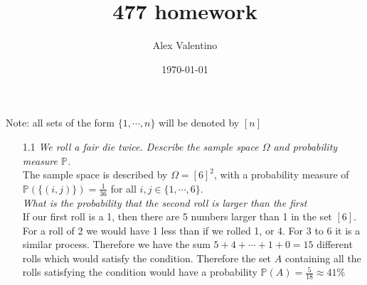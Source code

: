 \documentclass[12pt, letterpaper]{article}
\date{\today}
\author{Alex Valentino}
\title{477 homework}
\begin{document}
Note: all sets of the form $\{1,\cdots, n\}$ will be denoted by $[n]$
\begin{enumerate}
	\item[1.1] \textit{We roll a fair die twice.  Describe the sample space $\Omega$ and probability measure $\mathbb{P}$.}\\
	The sample space is described by $\Omega = [6]^2$, with a probability measure of $\mathbb{P}(\{(i,j)\}) = \frac{1}{36}$ for all $i,j \in \{1,\cdots, 6\}$.\\
	\textit{What is the probability that the second roll is larger than the first}\\
	If our first roll is a 1, then there are 5 numbers larger than 1 in the set 
	$[6]$.  For a roll of 2 we would have 1 less than if we rolled 1, or 4.
	For 3 to 6 it is a similar process.  Therefore we have the sum $5+4+\cdots+1+0 = 15$ different rolls which would satisfy the condition.  Therefore the set $A$ containing all the rolls satisfying the condition would have a probability $\mathbb{P} (A) = \frac{5}{18}\approx 41\%$
	

\end{enumerate}
\end{document}
